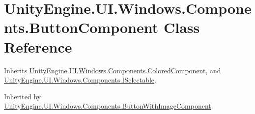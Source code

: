 \hypertarget{class_unity_engine_1_1_u_i_1_1_windows_1_1_components_1_1_button_component}{}\section{Unity\+Engine.\+U\+I.\+Windows.\+Components.\+Button\+Component Class Reference}
\label{class_unity_engine_1_1_u_i_1_1_windows_1_1_components_1_1_button_component}


Inherits \hyperlink{class_unity_engine_1_1_u_i_1_1_windows_1_1_components_1_1_colored_component}{Unity\+Engine.\+U\+I.\+Windows.\+Components.\+Colored\+Component}, and \hyperlink{interface_unity_engine_1_1_u_i_1_1_windows_1_1_components_1_1_i_selectable}{Unity\+Engine.\+U\+I.\+Windows.\+Components.\+I\+Selectable}.



Inherited by \hyperlink{class_unity_engine_1_1_u_i_1_1_windows_1_1_components_1_1_button_with_image_component}{Unity\+Engine.\+U\+I.\+Windows.\+Components.\+Button\+With\+Image\+Component}.

